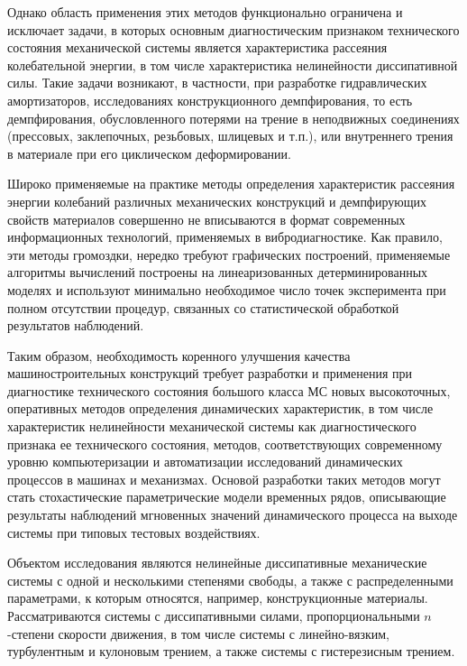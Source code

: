 {Однако область применения этих методов функционально ограничена и исключает задачи, в которых основным диагностическим признаком технического состояния механической системы является характеристика рассеяния колебательной энергии, в том числе характеристика нелинейности диссипативной силы. Такие задачи возникают, в частности, при разработке гидравлических амортизаторов, исследованиях конструкционного демпфирования, то есть демпфирования, обусловленного потерями на трение в неподвижных соединениях (прессовых, заклепочных, резьбовых, шлицевых и т.п.), или внутреннего трения в материале при его циклическом деформировании.

Широко применяемые на практике методы определения характеристик рассеяния энергии колебаний различных механических конструкций и демпфирующих свойств материалов совершенно не вписываются в формат современных информационных технологий, применяемых в вибродиагностике. Как правило, эти методы громоздки, нередко требуют графических построений, применяемые алгоритмы вычислений построены на линеаризованных детерминированных моделях и используют минимально необходимое число точек эксперимента при полном отсутствии процедур, связанных со статистической обработкой результатов наблюдений. 

Таким образом, необходимость коренного улучшения качества машиностроительных конструкций требует разработки и применения при диагностике технического состояния большого класса МС новых высокоточных, оперативных методов определения динамических характеристик, в том числе характеристик нелинейности механической системы как диагностического признака ее технического состояния, методов, соответствующих современному уровню компьютеризации и автоматизации исследований динамических процессов в машинах и механизмах. Основой разработки таких методов могут стать стохастические параметрические модели временных рядов, описывающие результаты наблюдений мгновенных значений динамического процесса на выходе системы при типовых тестовых воздействиях.

Объектом исследования являются нелинейные диссипативные механические системы с одной и несколькими степенями свободы, а также с распределенными параметрами, к которым относятся, например, конструкционные материалы. Рассматриваются системы с диссипативными силами, пропорциональными $n$-степени скорости движения, в том числе системы с линейно-вязким, турбулентным и кулоновым трением, а также системы с гистерезисным трением.

}
